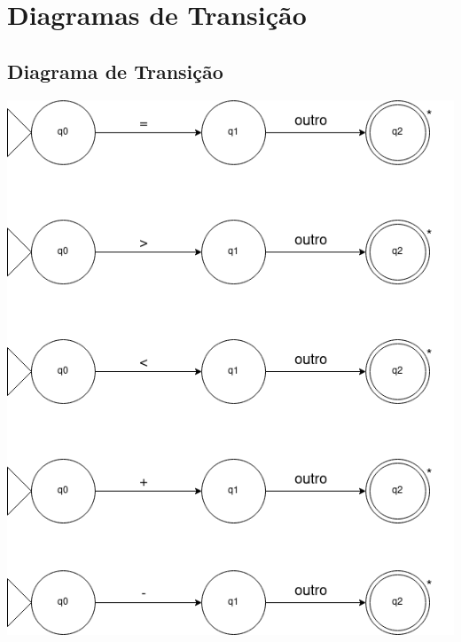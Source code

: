 \documentclass[
	12pt,				%
	openright,			%
	twoside,			%
	a4paper,			%
	english,			%
	french,				%
	spanish,			%
	brazil				%
	]{abntex2}
\begin{document}
\part{Diagramas de Transição}

\chapter{Diagrama de Transição}
\includegraphics[scale=0.7]{1.png}
\\
\\
\end{document}
